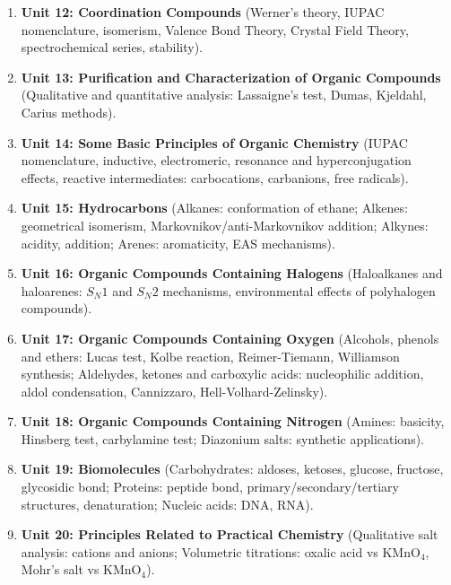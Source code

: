 \documentclass[10pt,twoside,openright]{book}
\begin{document}
\begin{enumerate}[leftmargin=*]
  \item \textbf{Unit 12: Coordination Compounds} (Werner's theory, IUPAC nomenclature, isomerism, Valence Bond Theory, Crystal Field Theory, spectrochemical series, stability).
  \item \textbf{Unit 13: Purification and Characterization of Organic Compounds} (Qualitative and quantitative analysis: Lassaigne's test, Dumas, Kjeldahl, Carius methods).
  \item \textbf{Unit 14: Some Basic Principles of Organic Chemistry} (IUPAC nomenclature, inductive, electromeric, resonance and hyperconjugation effects, reactive intermediates: carbocations, carbanions, free radicals).
  \item \textbf{Unit 15: Hydrocarbons} (Alkanes: conformation of ethane; Alkenes: geometrical isomerism, Markovnikov/anti-Markovnikov addition; Alkynes: acidity, addition; Arenes: aromaticity, EAS mechanisms).
  \item \textbf{Unit 16: Organic Compounds Containing Halogens} (Haloalkanes and haloarenes: $S_N1$ and $S_N2$ mechanisms, environmental effects of polyhalogen compounds).
  \item \textbf{Unit 17: Organic Compounds Containing Oxygen} (Alcohols, phenols and ethers: Lucas test, Kolbe reaction, Reimer-Tiemann, Williamson synthesis; Aldehydes, ketones and carboxylic acids: nucleophilic addition, aldol condensation, Cannizzaro, Hell-Volhard-Zelinsky).
  \item \textbf{Unit 18: Organic Compounds Containing Nitrogen} (Amines: basicity, Hinsberg test, carbylamine test; Diazonium salts: synthetic applications).
  \item \textbf{Unit 19: Biomolecules} (Carbohydrates: aldoses, ketoses, glucose, fructose, glycosidic bond; Proteins: peptide bond, primary/secondary/tertiary structures, denaturation; Nucleic acids: DNA, RNA).
  \item \textbf{Unit 20: Principles Related to Practical Chemistry} (Qualitative salt analysis: cations and anions; Volumetric titrations: oxalic acid vs KMnO$_4$, Mohr's salt vs KMnO$_4$).
\end{enumerate}
\end{document}
